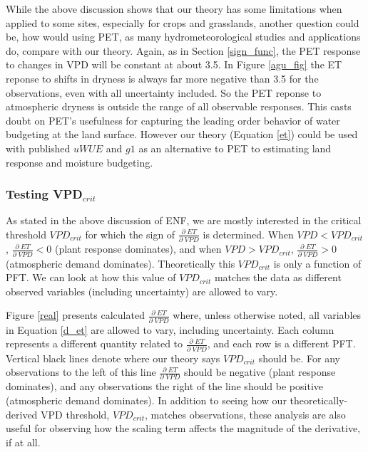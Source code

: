 \documentclass[draft,linenumbers]{agujournal}
\begin{document}
While the above discussion shows that our theory has some limitations when applied to some sites, especially for crops and grasslands, another question could be, how would using PET, as many hydrometeorological studies and applications do, compare with our theory.  Again, as in Section \ref{sign_func}, the PET response to changes in VPD will be constant at about 3.5. In Figure \ref{agu_fig} the ET reponse to shifts in dryness is always far more negative than 3.5 for the observations, even with all uncertainty included. So the PET reponse to atmospheric dryness is outside the range of all observable responses. This casts doubt on PET's usefulness for capturing the leading order behavior of water budgeting at the land surface. However our theory (Equation \ref{et}) could be used with published $uWUE$ and $g1$ as an alternative to PET to estimating land response and moisture budgeting.

\subsubsection{Testing VPD$_{crit}$}
As stated in the above discussion of ENF, we are mostly interested in the critical threshold $VPD_{crit}$ for which the sign of  $\frac{\partial \; ET}{\partial \; VPD}$ is determined. When $VPD < VPD_{crit}$, $\frac{\partial \; ET}{\partial \; VPD}  < 0$ (plant response dominates), and when $VPD > VPD_{crit}$, $\frac{\partial \; ET}{\partial \; VPD} > 0$ (atmospheric demand dominates). Theoretically this $VPD_{crit}$ is only a function of PFT. We can look at how this value of $VPD_{crit}$ matches the data as different observed variables (including uncertainty) are allowed to vary.


Figure \ref{real} presents calculated $\frac{\partial \; ET}{\partial \; VPD}$ where, unless otherwise noted, all variables in Equation \ref{d_et} are allowed to vary, including uncertainty. Each column represents a different quantity related to $\frac{\partial \; ET}{\partial \; VPD}$, and each row is a different PFT. Vertical black lines denote where our theory says $VPD_{crit}$ should be. For any observations to the left of this line $\frac{\partial \; ET}{\partial \; VPD}$ should be negative (plant response dominates), and any observations the right of the line should be positive (atmospheric demand dominates). In addition to seeing how our theoretically-derived VPD threshold, $VPD_{crit}$, matches observations, these analysis are also useful for observing how the scaling term affects the magnitude of the derivative, if at all. 
\end{document}
